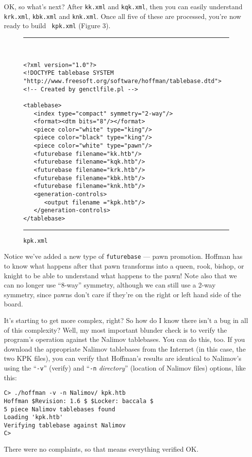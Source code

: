 \documentclass[11pt]{article}
\begin{document}
OK, so what's next?  After {\tt kk.xml} and {\tt kqk.xml}, then you
can easily understand {\tt krk.xml}, {\tt kbk.xml} and {\tt knk.xml}.
Once all five of these are processed, you're now ready to build {\tt
kpk.xml} (Figure 3).

\begin{figure}
\hrule\ 
{\small\begin{verbatim}
<?xml version="1.0"?>
<!DOCTYPE tablebase SYSTEM "http://www.freesoft.org/software/hoffman/tablebase.dtd">
<!-- Created by genctlfile.pl -->

<tablebase>
   <index type="compact" symmetry="2-way"/>
   <format><dtm bits="8"/></format>
   <piece color="white" type="king"/>
   <piece color="black" type="king"/>
   <piece color="white" type="pawn"/>
   <futurebase filename="kk.htb"/>
   <futurebase filename="kqk.htb"/>
   <futurebase filename="krk.htb"/>
   <futurebase filename="kbk.htb"/>
   <futurebase filename="knk.htb"/>
   <generation-controls>
      <output filename ="kpk.htb"/>
   </generation-controls>
</tablebase>
\end{verbatim}}
\hrule
\caption{\tt kpk.xml}
\end{figure}

Notice we've added a new type of {\tt futurebase} --- pawn promotion.
Hoffman has to know what happens after that pawn transforms into a
queen, rook, bishop, or knight to be able to understand what happens
to the pawn!  Note also that we can no longer use ``8-way'' symmetry,
although we can still use a 2-way symmetry, since pawns don't care if
they're on the right or left hand side of the board.

It's starting to get more complex, right?  So how do I know there
isn't a bug in all of this complexity?  Well, my most important
blunder check is to verify the program's operation against the Nalimov
tablebases.  You can do this, too.  If you download the appropriate
Nalimov tablebases from the Internet (in this case, the two KPK
files), you can verify that Hoffman's results are identical to
Nalimov's using the ``{\tt -v}'' (verify) and ``{\tt -n} {\it
directory}'' (location of Nalimov files) options, like this:

\begin{verbatim}
C> ./hoffman -v -n Nalimov/ kpk.htb
Hoffman $Revision: 1.6 $ $Locker: baccala $
5 piece Nalimov tablebases found
Loading 'kpk.htb'
Verifying tablebase against Nalimov
C>
\end{verbatim}

There were no complaints, so that means everything verified OK.
\end{document}
